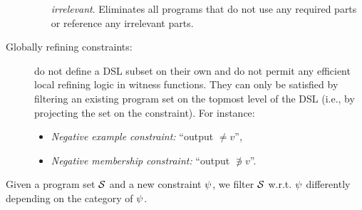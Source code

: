 \begin{description}
\begin{itemize}[nosep]
                \emph{irrelevant}.
                Eliminates all programs that do not use any required parts or reference any irrelevant parts.
        \end{itemize}
    \item[Globally refining constraints:] do not define a DSL subset on their own and do not permit any
        efficient local refining logic in witness functions.
        They can only be satisfied by filtering an existing program set on the topmost level of the DSL (i.e., by
        projecting the set on the constraint).
        For instance:
        \begin{itemize}[nosep]
            \item \emph{Negative example constraint:} ``output $\ne v$'',
            \item \emph{Negative membership constraint:} ``output $\not\ni v$''.
        \end{itemize}
\end{description}
Given a program set $\mathcal{S}$ and a new constraint $\psi$, we filter $\mathcal{S}$ w.r.t.
$\psi$ differently depending on the category of $\psi$.


